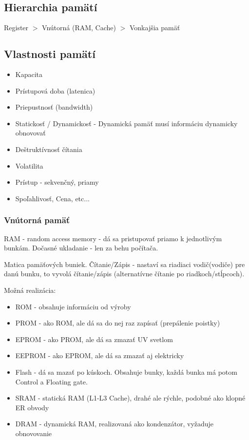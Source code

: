 \documentclass[a4paper,10pt]{article}
\begin{document}
\begin{multicols}{2}

	\subsection{Hierarchia pamätí}
	
	Register $>$ Vnútorná (RAM, Cache) $>$ Vonkajšia pamäť
	
	\subsection{Vlastnosti pamätí}
		
		\begin{itemize}
			\item Kapacita
			\item Prístupová doba (latenica)
			\item Priepustnosť (bandwidth)
			\item Statickosť / Dynamickosť - Dynamická pamäť musí informáciu dynamicky obnovovať
			\item Deštruktívnosť čítania
			\item Volatilita
			\item Prístup - sekvenčný, priamy
			\item Spoľahlivosť, Cena, etc...
		\end{itemize}			
	
		\subsubsection{Vnútorná pamäť}

			RAM - random access memory - dá sa pristupovať priamo k jednotlivým bunkám. Dočasné ukladanie - len za behu počítača.

			Matica pamäťových buniek. Čítanie/Zápis - nastaví sa riadiaci vodič(vodiče) pre danú bunku, to vyvolá čítanie/zápis (alternatívne čítanie po riadkoch/stĺpcoch).
	
			Možná realizácia: 
		
			\begin{itemize}
				\item ROM - obsahuje informáciu od výroby
				\item PROM - ako ROM, ale dá sa do nej raz zapísať (prepálenie poistky)
				\item EPROM - ako PROM, ale dá sa zmazať UV svetlom
				\item EEPROM - ako EPROM, ale dá sa zmazať aj elektricky
				\item Flash - dá sa mazať po kúskoch. Obsahuje bunky, každá bunka má potom Control a Floating gate.
				\item SRAM - statická RAM (L1-L3 Cache), drahé ale rýchle, podobné ako klopné ER obvody
				\item DRAM - dynamická RAM, realizovaná ako kondenzátor, vyžaduje obnovovanie
			\end{itemize}
		

\end{multicols}
\end{document}

